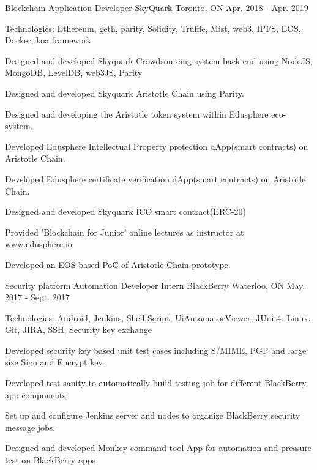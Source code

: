 \begin{cventries}
  \cventry
    {Blockchain Application Developer}
    {SkyQuark}
    {Toronto, ON}
    {Apr. 2018 - Apr. 2019}
    {
      \begin{cvitems}
        \item {Technologies: Ethereum, geth, parity, Solidity, Truffle, Mist, web3, IPFS, EOS, Docker, koa framework}
        \item {Designed and developed Skyquark Crowdsourcing system back-end using NodeJS, MongoDB, LevelDB, web3JS, Parity}
        \item {Designed and developed Skyquark Aristotle Chain using Parity.}
        \item {Designed and developing the Aristotle token system within Edusphere eco-system.}
        \item {Developed Edusphere Intellectual Property protection dApp(smart contracts) on Aristotle Chain.}
        \item {Developed Edusphere certificate verification dApp(smart contracts) on Aristotle Chain.}
        \item {Designed and developed Skyquark ICO smart contract(ERC-20)}
        \item {Provided 'Blockchain for Junior' online lectures as instructor at www.edusphere.io}
        \item {Developed an EOS based PoC of Aristotle Chain prototype.}
      \end{cvitems}
    }
	

  \cventry
    {Security platform Automation Developer Intern}
    {BlackBerry}
    {Waterloo, ON}
    {May. 2017 - Sept. 2017}
    {
      \begin{cvitems}
        \item {Technologies: Android, Jenkins, Shell Script, UiAutomatorViewer, JUnit4, Linux, Git, JIRA, SSH, Security key exchange}
        \item {Developed security key based unit test cases including S/MIME, PGP and large size Sign and Encrypt key.}
        \item {Developed test sanity to automatically build testing job for different BlackBerry app components.}
        \item {Set up and configure Jenkins server and nodes to organize BlackBerry security message jobs.}
        \item {Designed and developed Monkey command tool App for automation and pressure test on BlackBerry apps.}
      \end{cvitems}
    }
  

\end{cventries}

